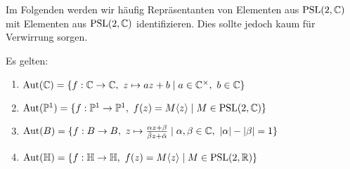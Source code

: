 \begin{rem}
  Im Folgenden werden wir häufig Repräsentanten von Elementen aus
  $\operatorname{PSL}(2, \mathbb{C})$ mit Elementen aus $\operatorname{PSL}(2, \mathbb{C})$ identifizieren. Dies
  sollte jedoch kaum für Verwirrung sorgen.
\end{rem}

\begin{thm}
  \label{thm:aut}
  Es gelten:
  \begin{enumerate}
  \item $\operatorname{Aut}(\mathbb{C}) = \{ f: \mathbb{C} \rightarrow \mathbb{C}, \ z \mapsto az + b \mid a \in
    \mathbb{C}^\times, \ b \in \mathbb{C} \}$
  \item $\Aut(\P^1) = \{ f: \P^1 \ra \P^1,\ f(z) = M\langle z \rangle \mid
    M \in \PSL(2, \C) \}$
  \item $\operatorname{Aut}(B) = \{ f: B \rightarrow B,\ z \mapsto \frac{\alpha z +
      \beta}{\bar \beta z + \bar \alpha} \mid \alpha, \beta \in \mathbb{C}, \
    |\alpha |- |\beta| = 1\}$
  \item $\operatorname{Aut}(\mathbb{H}) = \{f: \mathbb{H} \rightarrow \mathbb{H},\ f(z) = M\langle z \rangle 
    \mid M \in \operatorname{PSL}(2, \mathbb{R}) \}$
  \end{enumerate}
\end{thm}

